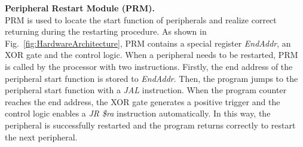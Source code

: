 \noindent\textbf{Peripheral Restart Module (PRM).} \\
PRM is used to locate the start function of peripherals and realize correct returning during the restarting procedure.
As shown in Fig.~\ref{fig:HardwareArchitecture}, PRM contains a special register \emph{EndAddr}, an XOR gate and the control logic.
When a peripheral needs to be restarted, PRM is called by the processor with two instructions.
Firstly, the end address of the peripheral start function is stored to \emph{EndAddr}.
Then, the program jumps to the peripheral start function with a \emph{JAL} instruction.
When the program counter reaches the end address, the XOR gate generates a positive trigger and the control logic enables a \emph{JR \$ra} instruction automatically.
In this way, the peripheral is successfully restarted and the program returns correctly to restart the next peripheral.
